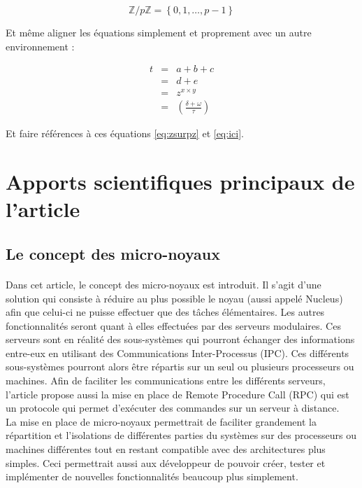 \documentclass[a4paper, 12pt]{article}
\begin{document}
\begin{equation}
\label{eq:zsurpz}
\mathbb{Z}/p\mathbb{Z} = \left\lbrace 0, 1, \ldots, p-1  \right\rbrace
\end{equation}

Et même aligner les équations simplement et proprement avec un autre environnement :

\begin{eqnarray}
t &=& a+b+c\\
&=& d+e \\
&=& z^{x\times y}\label{eq:ici}\\
&=& \left(\frac{\delta + \omega}{\tau}\right)
\end{eqnarray}

Et faire références à ces équations \eqref{eq:zsurpz} et \eqref{eq:ici}.

\clearpage 
\section{Apports scientifiques principaux de l’article}
\subsection{Le concept des micro-noyaux}
\paragraph{}

Dans cet article, le concept des micro-noyaux est introduit. Il s'agit d'une solution qui consiste à réduire au plus possible le noyau (aussi appelé Nucleus) afin que celui-ci ne puisse effectuer que des tâches élémentaires. Les autres fonctionnalités seront quant à elles effectuées par des serveurs modulaires. Ces serveurs sont en réalité des sous-systèmes qui pourront échanger des informations entre-eux en utilisant des Communications Inter-Processus (IPC). Ces différents sous-systèmes pourront alors être répartis sur un seul ou plusieurs processeurs ou machines. Afin de faciliter les communications entre les différents serveurs, l'article propose aussi la mise en place de Remote Procedure Call (RPC) qui est un protocole qui permet d'exécuter des commandes sur un serveur à distance. \\
La mise en place de micro-noyaux permettrait de faciliter grandement la répartition et l'isolations de différentes parties du systèmes sur des processeurs ou machines différentes tout en restant compatible avec des architectures plus simples. Ceci permettrait aussi aux développeur de pouvoir créer, tester et implémenter de nouvelles fonctionnalités beaucoup plus simplement.
\end{document}
